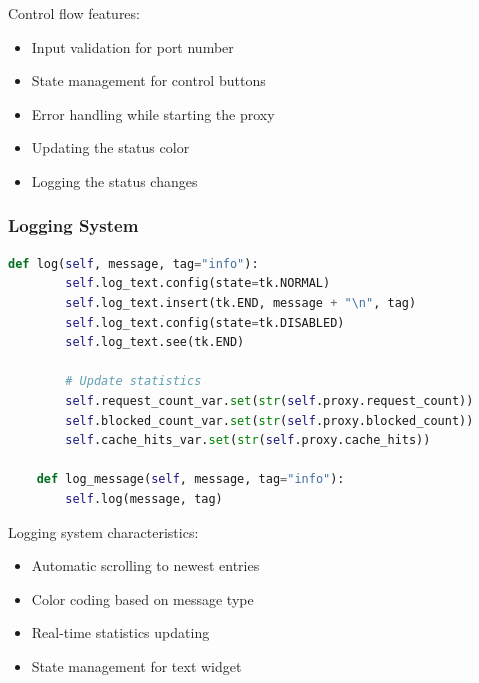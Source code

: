 \documentclass[a4paper]{article}
\begin{document}
	Control flow features:
	\begin{itemize}
		\item Input validation for port number
		\item State management for control buttons
		\item Error handling while starting the proxy
		\item Updating the status color
		\item Logging the status changes
	\end{itemize}
	
	\subsubsection{Logging System}
	\vspace{0.5cm}
	\begin{lstlisting}[language=Python, caption=Logging Implementation]
	def log(self, message, tag="info"):
		self.log_text.config(state=tk.NORMAL)
		self.log_text.insert(tk.END, message + "\n", tag)
		self.log_text.config(state=tk.DISABLED)
		self.log_text.see(tk.END)
		
		# Update statistics
		self.request_count_var.set(str(self.proxy.request_count))
		self.blocked_count_var.set(str(self.proxy.blocked_count))
		self.cache_hits_var.set(str(self.proxy.cache_hits))
		
	def log_message(self, message, tag="info"):
		self.log(message, tag)
	\end{lstlisting}
	
	Logging system characteristics:
	\begin{itemize}
		\item Automatic scrolling to newest entries
		\item Color coding based on message type
		\item Real-time statistics updating
		\item State management for text widget
	\end{itemize}
	
\end{document}
